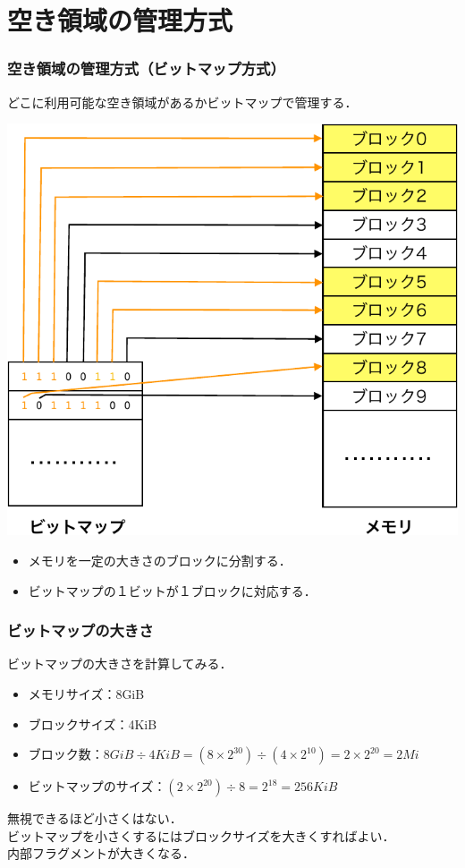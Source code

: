 \documentclass{beamer}                   %
\begin{document}
\section{空き領域の管理方式}
\begin{frame}
  \frametitle{空き領域の管理方式（ビットマップ方式）}
  どこに利用可能な空き領域があるかビットマップで管理する．
  \begin{center}
    \includegraphics[scale=0.5]{Fig/bitMap-crop.pdf}\\
  \end{center}
  \begin{itemize}
  \item メモリを一定の大きさのブロックに分割する．
  \item ビットマップの１ビットが１ブロックに対応する．
  \end{itemize}
\end{frame}

\begin{frame}
  \frametitle{ビットマップの大きさ}
  ビットマップの大きさを計算してみる．
  \begin{itemize}
  \item メモリサイズ：8GiB
  \item ブロックサイズ：4KiB
  \item ブロック数：$8GiB \div 4KiB = (8\times 2^{30}) \div (4 \times 2^{10})
    = 2 \times 2^{20} = 2Mi$
  \item ビットマップのサイズ：$(2 \times 2^{20}) \div 8 = 2^{18} = 256KiB$
  \end{itemize}
  無視できるほど小さくはない．\\
  ビットマップを小さくするにはブロックサイズを大きくすればよい．\\
  内部フラグメントが大きくなる．
\end{frame}
\end{document}
